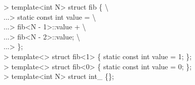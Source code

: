 
\begin{tttenv}
> template<int N> struct fib \{ \textbackslash{} \\
...> static const int value = \textbackslash{} \\
...>    fib<N - 1>::value + \textbackslash{} \\
...>    fib<N - 2>::value; \textbackslash{} \\
...> \}; \\
> template<> struct fib<1> \{ static
const int value = 1; \}; \\
> template<> struct fib<0> \{ static
const int value = 0; \}; \\
> template<int N> struct int\_ \{\};
\end{tttenv}


